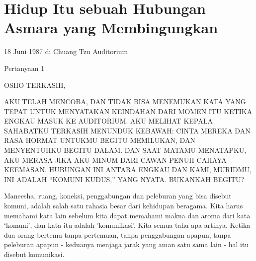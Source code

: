 \chapter{Hidup Itu sebuah Hubungan Asmara yang Membingungkan}

18 Juni 1987 di Chuang Tzu Auditorium

Pertanyaan 1

OSHO TERKASIH,

AKU TELAH MENCOBA, DAN TIDAK BISA MENEMUKAN KATA YANG TEPAT UNTUK MENYATAKAN KEINDAHAN DARI MOMEN ITU KETIKA ENGKAU MASUK KE AUDITORIUM. AKU MELIHAT KEPALA SAHABATKU TERKASIH MENUNDUK KEBAWAH: CINTA MEREKA DAN RASA HORMAT UNTUKMU BEGITU MEMILUKAN, DAN MENYENTUHKU BEGITU DALAM. DAN SAAT MATAMU MENATAPKU, AKU MERASA JIKA AKU MINUM DARI CAWAN PENUH CAHAYA KEEMASAN. HUBUNGAN INI ANTARA ENGKAU DAN KAMI, MURIDMU, INI ADALAH “KOMUNI KUDUS,” YANG NYATA. BUKANKAH BEGITU?

Maneesha, ruang, koneksi, penggabungan dan peleburan yang bisa disebut komuni, adalah salah satu rahasia besar dari kehidupan beragama. Kita harus memahami kata lain sebelum kita dapat memahami makna dan aroma dari kata ‘komuni’, dan kata itu adalah 'komunikasi'. Kita semua tahu apa artinya. Ketika dua orang bertemu tanpa pertemuan, tanpa penggabungan apapun, tanpa peleburan apapun - keduanya menjaga jarak yang aman satu sama lain - hal itu disebut komunikasi.


